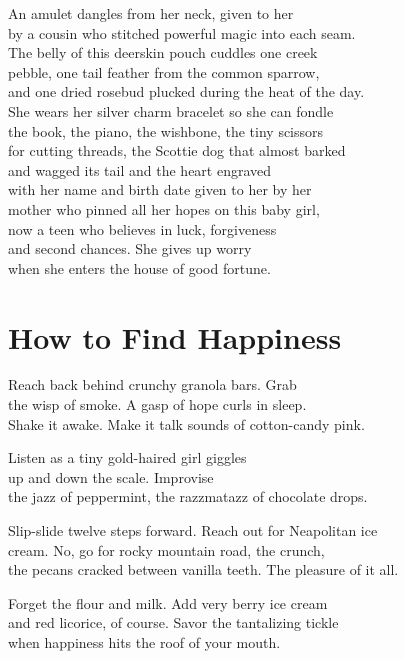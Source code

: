 \documentclass[twoside,10pt]{book}
\begin{document}
An amulet dangles from her neck, given to her\\
by a cousin who stitched powerful magic into each seam.\\
The belly of this deerskin pouch cuddles one creek\\
pebble, one tail feather from the common sparrow,\\
and one dried rosebud plucked during the heat of the day.\\
She wears her silver charm bracelet so she can fondle\\
the book, the piano, the wishbone, the tiny scissors\\
for cutting threads, the Scottie dog that almost barked\\
and wagged its tail and the heart engraved\\
with her name and birth date given to her by her\\
mother who pinned all her hopes on this baby girl,\\
now a teen who believes in luck, forgiveness\\
and second chances. She gives up worry\\
when she enters the house of good fortune.


\clearpage
\section{How to Find Happiness}

Reach back behind crunchy granola bars. Grab\\
the wisp of smoke. A gasp of hope curls in sleep.\\
Shake it awake. Make it talk sounds of cotton-candy pink.

Listen as a tiny gold-haired girl giggles\\
up and down the scale. Improvise\\
the jazz of peppermint, the razzmatazz of chocolate drops.

Slip-slide twelve steps forward. Reach out for Neapolitan ice\\
cream. No, go for rocky mountain road, the crunch,\\
the pecans cracked between vanilla teeth. The pleasure of it all.

Forget the flour and milk. Add very berry ice cream\\
and red licorice, of course. Savor the tantalizing tickle\\
when happiness hits the roof of your mouth.
\end{document}

